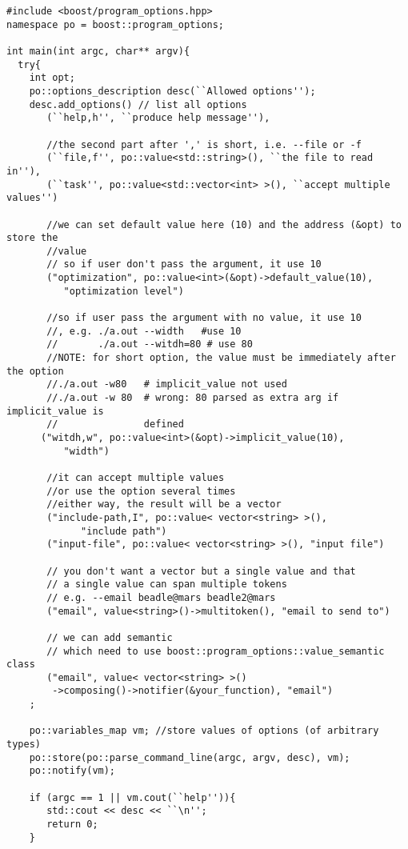{\small \begin{verbatim}
#include <boost/program_options.hpp>
namespace po = boost::program_options;

int main(int argc, char** argv){
  try{
    int opt;
    po::options_description desc(``Allowed options'');
    desc.add_options() // list all options
       (``help,h'', ``produce help message''),

       //the second part after ',' is short, i.e. --file or -f
       (``file,f'', po::value<std::string>(), ``the file to read in''),
       (``task'', po::value<std::vector<int> >(), ``accept multiple values'')

       //we can set default value here (10) and the address (&opt) to store the
       //value
       // so if user don't pass the argument, it use 10 
       ("optimization", po::value<int>(&opt)->default_value(10), 
          "optimization level")

       //so if user pass the argument with no value, it use 10
       //, e.g. ./a.out --width   #use 10
       //       ./a.out --witdh=80 # use 80
       //NOTE: for short option, the value must be immediately after the option
       //./a.out -w80   # implicit_value not used
       //./a.out -w 80  # wrong: 80 parsed as extra arg if implicit_value is
       //               defined 
      ("witdh,w", po::value<int>(&opt)->implicit_value(10), 
          "width")

       //it can accept multiple values
       //or use the option several times
       //either way, the result will be a vector
       ("include-path,I", po::value< vector<string> >(), 
             "include path")
       ("input-file", po::value< vector<string> >(), "input file")
       
       // you don't want a vector but a single value and that 
       // a single value can span multiple tokens
       // e.g. --email beadle@mars beadle2@mars
       ("email", value<string>()->multitoken(), "email to send to")
       
       // we can add semantic
       // which need to use boost::program_options::value_semantic class
       ("email", value< vector<string> >()
        ->composing()->notifier(&your_function), "email")          
    ;	
    
    po::variables_map vm; //store values of options (of arbitrary types)
    po::store(po::parse_command_line(argc, argv, desc), vm);
    po::notify(vm);
  
    if (argc == 1 || vm.cout(``help'')){
       std::cout << desc << ``\n'';
       return 0;
    }


\end{verbatim}}
